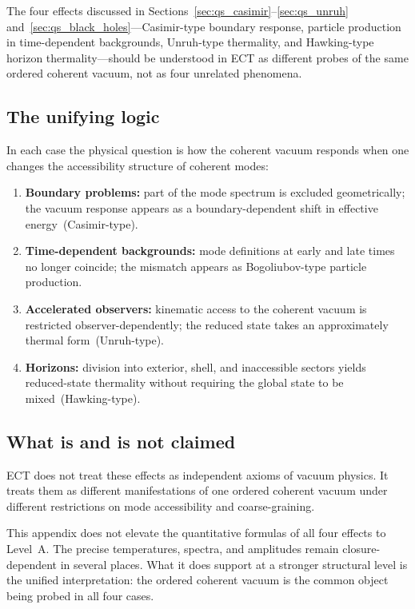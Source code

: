 \medskip
The four effects discussed in
Sections~\ref{sec:qs_casimir}--\ref{sec:qs_unruh}
and~\ref{sec:qs_black_holes}---Casimir-type boundary response, particle
production in time-dependent backgrounds, Unruh-type thermality, and
Hawking-type horizon thermality---should be understood in ECT as
different probes of the same ordered coherent vacuum, not as four
unrelated phenomena.

\subsection*{The unifying logic}

In each case the physical question is how the coherent vacuum responds
when one changes the accessibility structure of coherent modes:
\begin{enumerate}[label=(\roman*)]
  \item \textbf{Boundary problems:} part of the mode spectrum is
    excluded geometrically; the vacuum response appears as a
    boundary-dependent shift in effective energy~(Casimir-type).
  \item \textbf{Time-dependent backgrounds:} mode definitions at early
    and late times no longer coincide; the mismatch appears as
    Bogoliubov-type particle production.
  \item \textbf{Accelerated observers:} kinematic access to the coherent
    vacuum is restricted observer-dependently; the reduced state takes
    an approximately thermal form~(Unruh-type).
  \item \textbf{Horizons:} division into exterior, shell, and inaccessible
    sectors yields reduced-state thermality without requiring the global
    state to be mixed~(Hawking-type).
\end{enumerate}

\subsection*{What is and is not claimed}

ECT does not treat these effects as independent axioms of vacuum physics.
It treats them as different manifestations of one ordered coherent vacuum
under different restrictions on mode accessibility and coarse-graining.

This appendix does not elevate the quantitative formulas of all four
effects to Level~A.
The precise temperatures, spectra, and amplitudes remain
closure-dependent in several places.
What it does support at a stronger structural level is the unified
interpretation: the ordered coherent vacuum is the common object being
probed in all four cases.

